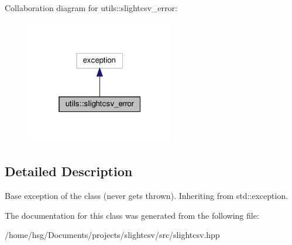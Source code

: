 Collaboration diagram for utils\+:\+:slightcsv\+\_\+error\+:\nopagebreak
\begin{figure}[H]
\begin{center}
\leavevmode
\includegraphics[width=184pt]{classutils_1_1slightcsv__error__coll__graph}
\end{center}
\end{figure}


\subsection{Detailed Description}
Base exception of the class (never gets thrown). Inheriting from std\+::exception. 

The documentation for this class was generated from the following file\+:\begin{DoxyCompactItemize}
\item 
/home/hsg/\+Documents/projects/slightcsv/src/slightcsv.\+hpp\end{DoxyCompactItemize}
